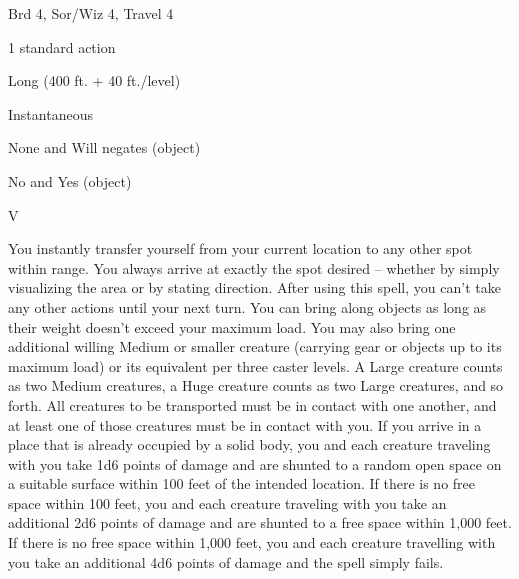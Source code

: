 
\begin{description*}
\item[Level:] Brd 4, Sor/Wiz 4, Travel 4
\item[Casting Time:] 1 standard action
\item[Range:] Long (400 ft. + 40 ft./level)
\item[Duration:] Instantaneous
\item[Saving Throw:] None and Will negates (object)
\item[Spell Resistance:] No and Yes (object)
\item[Components:] V
\end{description*}

You instantly transfer yourself from your current location to any other spot within
range. You always arrive at exactly the spot desired -- whether by simply visualizing
the area or by stating direction. After using this spell, you can't take any other
actions until your next turn. You can bring along objects as long as their weight
doesn't exceed your maximum load. You may also bring one additional willing Medium
or smaller creature (carrying gear or objects up to its maximum load) or its equivalent
per three caster levels. A Large creature counts as two Medium creatures, a Huge
creature counts as two Large creatures, and so forth. All creatures to be transported
must be in contact with one another, and at least one of those creatures must be
in contact with you.
If you arrive in a place that is already occupied by a solid body, you and each
creature traveling with you take 1d6 points of damage and are shunted to a random
open space on a suitable surface within 100 feet of the intended location.
If there is no free space within 100 feet, you and each creature traveling with
you take an additional 2d6 points of damage and are shunted to a free space within
1,000 feet. If there is no free space within 1,000 feet, you and each creature
travelling with you take an additional 4d6 points of damage and the spell simply
fails.